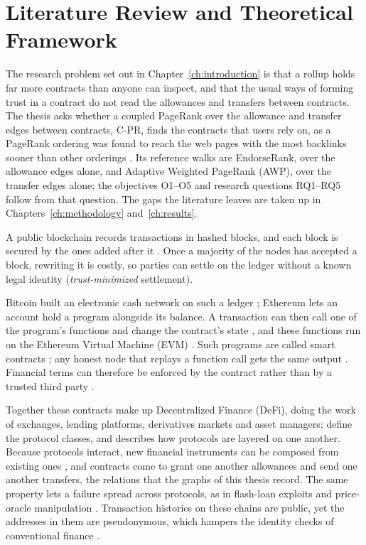 \chapter{Literature Review and Theoretical Framework}
\label{ch:literature}

The research problem set out in Chapter~\ref{ch:introduction} is that a rollup holds far more contracts than anyone can inspect, and that the usual ways of forming trust in a contract do not read the allowances and transfers between contracts. The thesis asks whether a coupled PageRank over the allowance and transfer edges between contracts, \mbox{C-PR}, finds the contracts that users rely on, as a PageRank ordering was found to reach the web pages with the most backlinks sooner than other orderings \parencite{cho1998crawling}. Its reference walks are EndorseRank, over the allowance edges alone, and Adaptive Weighted PageRank (AWP), over the transfer edges alone; the objectives O1--O5 and research questions RQ1--RQ5 follow from that question. The gaps the literature leaves are taken up in Chapters~\ref{ch:methodology} and~\ref{ch:results}.


A public blockchain records transactions in hashed blocks, and each block is secured by the ones added after it \parencite{nakamoto2008bitcoin}. Once a majority of the nodes has accepted a block, rewriting it is costly, so parties can settle on the ledger without a known legal identity (\emph{trust-minimized} settlement).

Bitcoin built an electronic cash network on such a ledger \parencite{nakamoto2008bitcoin}; Ethereum lets an account hold a program alongside its balance. A transaction can then call one of the program's functions and change the contract's state \parencite{buterin2014ethereum}, and these functions run on the Ethereum Virtual Machine (EVM) \parencite{wood2025yellowpaper}. Such programs are called smart contracts \parencite{szabo1997formalizing}; any honest node that replays a function call gets the same output \parencite{wood2025yellowpaper}. Financial terms can therefore be enforced by the contract rather than by a trusted third party \parencite{schar2021defi}.

Together these contracts make up Decentralized Finance (DeFi), doing the work of exchanges, lending platforms, derivatives markets and asset managers; \textcite{werner2022sok} define the protocol classes, and \textcite{schar2021defi} describes how protocols are layered on one another. Because protocols interact, new financial instruments can be composed from existing ones \parencite{kitzler2023defi}, and contracts come to grant one another allowances and send one another transfers, the relations that the graphs of this thesis record. The same property lets a failure spread across protocols, as in flash-loan exploits \parencite{qin2021flashloans} and price-oracle manipulation \parencite{zhou2023sok}. Transaction histories on these chains are public, yet the addresses in them are pseudonymous, which hampers the identity checks of conventional finance \parencite{lin2025riskprop}.

